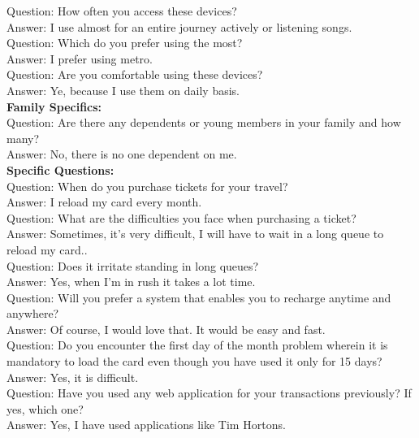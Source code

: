 \documentclass[11pt, english]{report}
\begin{document}
Question: How often you access these devices?\\
Answer: I use almost for an entire journey actively or listening songs.\\

Question: Which do you prefer using the most?\\
Answer: I prefer using metro.\\

Question: Are you comfortable using these devices?\\
Answer: Ye, because I use them on daily basis.\\

\textbf{Family Specifics:}\\

Question: Are there any dependents or young members in your family and how many?\\
Answer: No, there is no one dependent on me. \\

\textbf{Specific Questions:}\\

Question: When do you purchase tickets for your travel?\\
Answer: I reload my card every month.\\

Question: What are the difficulties you face when purchasing a ticket?\\
Answer: Sometimes, it's very difficult, I will have to wait in a long queue to reload my card..\\

Question: Does it irritate standing in long queues?\\
Answer: Yes, when I'm in rush it takes a lot time.\\

Question: Will you prefer a system that enables you to recharge anytime and anywhere?\\
Answer: Of course, I would love that. It would be easy and fast. \\

Question: Do you encounter the first day of the month problem wherein it is mandatory to load the
card even though you have used it only for 15 days?\\
Answer: Yes, it is difficult.\\

Question: Have you used any web application for your transactions previously? If yes, which one? \\
Answer: Yes, I have used applications like Tim Hortons.\\
\end{document}

